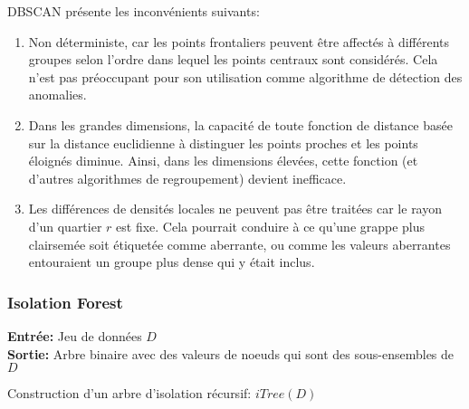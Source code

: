 DBSCAN présente les inconvénients suivants:
\begin{enumerate}
\item Non déterministe, car les points frontaliers peuvent être affectés à différents groupes selon l'ordre dans lequel les points centraux sont considérés.
Cela n'est pas préoccupant pour son utilisation comme algorithme de détection des anomalies.
\item Dans les grandes dimensions, la capacité de toute fonction de distance basée sur la distance euclidienne à distinguer les points proches et les points éloignés diminue.
Ainsi, dans les dimensions élevées, cette fonction (et d'autres algorithmes de regroupement) devient inefficace.
\item Les différences de densités locales ne peuvent pas être traitées car le rayon d'un quartier $r$ est fixe.
Cela pourrait conduire à ce qu'une grappe plus clairsemée soit étiquetée comme aberrante,
ou comme les valeurs aberrantes entouraient un groupe plus dense qui y était inclus.
\end{enumerate}

\subsubsection*{Isolation Forest}

\begin{algorithm}[h]
\SetAlgoLined
\textbf{Entrée:} Jeu de données $D$ %
\\
\textbf{Sortie:} Arbre binaire avec des valeurs de noeuds qui sont des sous-ensembles de $D$ %
\caption{Construction d'un arbre d'isolation récursif: $iTree(D)$} %
\end{algorithm}


